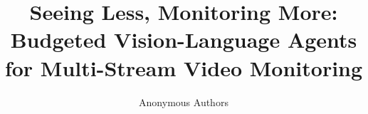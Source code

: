 \documentclass[10pt]{article}
\title{Seeing Less, Monitoring More:\\Budgeted Vision-Language Agents for Multi-Stream Video Monitoring}
\author{Anonymous Authors}
\date{}
\begin{document}
\maketitle

\begin{abstract}

\end{abstract}












\end{document}
